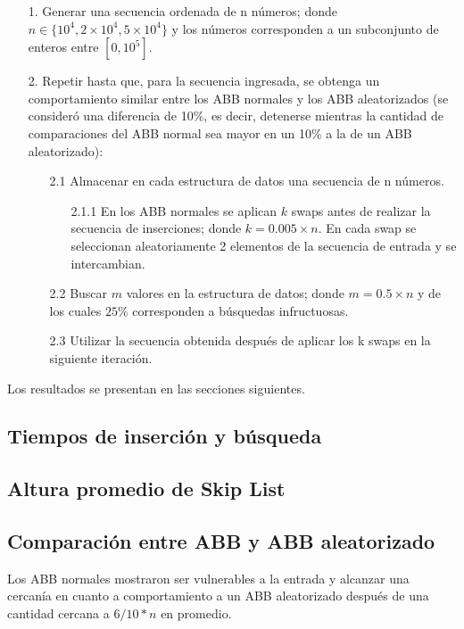 \documentclass[12pt,letterpaper]{article}
\begin{document}
\begin{itemize}
\item[1.] Generar una secuencia ordenada de n números; donde $n \in \{10^{4}, 2 \times 10^{4} , 5 \times 10^{4}\}$ y los números corresponden a un subconjunto de enteros entre $[0, 10^{5}]$.
\item[2.] Repetir hasta que, para la secuencia ingresada, se obtenga un comportamiento similar entre los ABB normales y los ABB aleatorizados (se consideró una diferencia de 10\%, es decir, detenerse mientras la cantidad de comparaciones del ABB normal sea mayor en un 10\% a la de un ABB aleatorizado):
	\begin{itemize}
	\item[2.1] Almacenar en cada estructura de datos una secuencia de n números.
		\begin{itemize}
		\item[2.1.1] En los ABB normales se aplican $k$ swaps antes de realizar la secuencia de inserciones; donde $k = 0.005 \times n$. En cada swap se seleccionan aleatoriamente 2 elementos de la secuencia de entrada y se intercambian.
		\end{itemize}
	\item[2.2] Buscar $m$ valores en la estructura de datos; donde $m = 0.5 \times n$ y de los cuales $25\%$ corresponden a búsquedas infructuosas.
	\item[2.3] Utilizar la secuencia obtenida después de aplicar los k swaps en la siguiente iteración.
	\end{itemize}
\end{itemize}

Los resultados se presentan en las secciones siguientes.

\subsection{Tiempos de inserción y búsqueda}

\subsection{Altura promedio de Skip List}

\subsection{Comparación entre ABB y ABB aleatorizado}
Los ABB normales mostraron ser vulnerables a la entrada y alcanzar una cercanía en cuanto a comportamiento a un ABB aleatorizado después de una cantidad cercana a $6/10*n$ en promedio.
\end{document}
